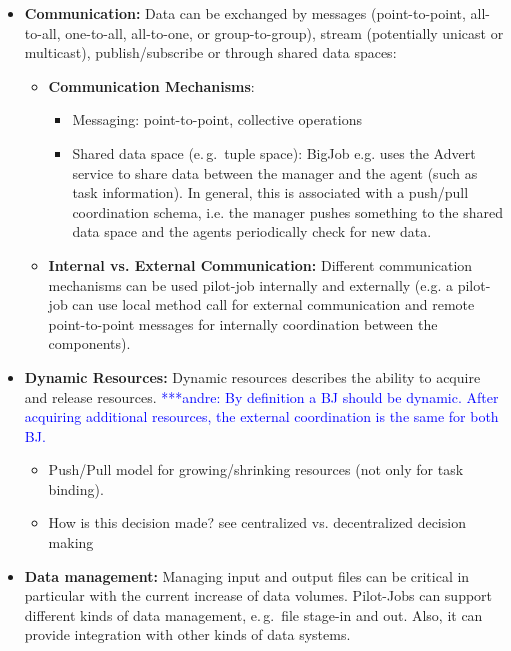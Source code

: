\documentclass[]{article}
\newcommand{\alnote}[1]{ {\textcolor{blue} { ***andre: #1 }}}
\newcommand{\alnote}[1]{}
\begin{document}
\begin{itemize}
\begin{itemize}
	\end{itemize}	
	\item \textbf{Communication:} Data can be exchanged by messages
    (point-to-point, all-to-all, one-to-all, all-to-one, or group-to-group),
    stream (potentially unicast or multicast), publish/subscribe or through     
    shared data spaces: 
    \begin{itemize}
           \item \textbf{Communication Mechanisms}:
            \begin{itemize}
            	\item Messaging: point-to-point, collective operations
            	\item Shared data space (e.\,g.\ tuple space): BigJob e.g. uses the 
            	Advert service to share data between the manager and the agent (such 
            	as task information). In general, this is associated with a 
            	push/pull 
            	coordination schema, i.e. the manager pushes something to the shared 
            	data space and the agents periodically check for new data.
            \end{itemize} 
   	\item \textbf{Internal vs. External Communication:} Different communication 
   	mechanisms can be used pilot-job 
       internally and externally (e.g. a pilot-job can use local method call for 
       external communication and remote point-to-point messages for internally 
       coordination between the components). 
       \end{itemize}
	\item \textbf{Dynamic Resources:} Dynamic resources describes the ability to acquire and release resources.
	    \alnote{By definition a BJ should be dynamic. After acquiring additional 
	    resources, the external coordination is the same for both BJ.}
		\begin{itemize}
			\item Push/Pull model for growing/shrinking resources 
			(not only for task binding).
			\item How is this decision made? see centralized vs. decentralized decision making
		\end{itemize}
	\item \textbf{Data management:} Managing input and output files can be critical in particular with the current increase of data volumes. Pilot-Jobs can support different kinds of data management, e.\,g.\ file stage-in and out. Also, it can provide integration with other kinds of data systems.

\end{itemize}
\end{document}
